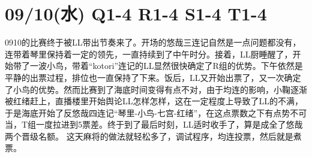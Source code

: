 \section{09/10(水) Q1-4 R1-4 S1-4 T1-4}


0910的比赛终于被LL带出节奏来了。开场的悠哉三连记自然是一点问题都没有，连带着琴里保持着一定的领先，一直持续到了中午时分。接着，LL厨睡醒了，开始带了一波小鸟，带着“kotori”连记的LL显然很快确定了R组的优势。下午依然是平静的出票过程，排位也一直保持了下来。饭后，LL又开始出票了，又一次确定了小鸟的优势。然而比赛到了海底时间变得有点不对，由于均连的影响，小鞠逐渐被红绪赶上，直播楼里开始舆论LL怎样怎样，这在一定程度上导致了LL的不满，于是海底开始了反悠哉四连记“琴里-小鸟-七宫-红绪”，在这点票数之下有点势不可当，T组一度拉进到5票差。终于到了最后时刻，LL适时收手了，算是成全了悠哉两个晋级名额。
这天麻将的做法就轻松多了，调试程序，均连投票，然后就是煮票。

